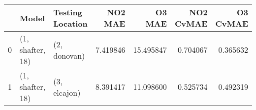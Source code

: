 \begin{tabular}{lllrrrr}
\toprule
{} &             Model & Testing Location &   NO2 MAE &     O3 MAE &  NO2 CvMAE &  O3 CvMAE \\
\midrule
0 &  (1, shafter, 18) &     (2, donovan) &  7.419846 &  15.495847 &   0.704067 &  0.365632 \\
1 &  (1, shafter, 18) &     (3, elcajon) &  8.391417 &  11.098600 &   0.525734 &  0.492319 \\
\bottomrule
\end{tabular}

